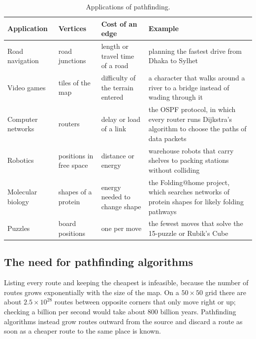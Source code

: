 \begin{table}[H]
  \centering
  \caption{Applications of pathfinding.}\label{tab:applications}
  \small
  \renewcommand{\arraystretch}{1.25}%
  \begin{tabular}{@{}P{2.5cm}P{2.6cm}P{3.1cm}P{5.6cm}@{}}
    \toprule
    Application & Vertices & Cost of an edge & Example\\
    \midrule
    Road navigation & road junctions & length or travel time of a road
      & planning the fastest drive from Dhaka to Sylhet\\
    Video games & tiles of the map & difficulty of the terrain entered
      & a character that walks around a river to a bridge instead of wading
        through it\\
    Computer networks & routers & delay or load of a link
            & the OSPF protocol, in
        which every router runs Dijkstra's algorithm to choose the paths of data
        packets\\
    Robotics & positions in free space & distance or energy
      & warehouse robots that carry shelves to packing stations without
        colliding\\
    Molecular biology & shapes of a protein & energy needed to change shape
      & the Folding@home project, which searches networks of protein shapes for
        likely folding pathways\\
    Puzzles & board positions & one per move
      & the fewest moves that solve the 15-puzzle or Rubik's
        Cube~\cite{korf1985, korf1997}\\
    \bottomrule
  \end{tabular}
\end{table}

\subsection{The need for pathfinding algorithms}\label{sec:need}

Listing every route and keeping the cheapest is infeasible, because the number
of routes grows exponentially with the size of the map. On a $50 \times 50$
grid there are about $2.5 \times 10^{28}$ routes between opposite corners that
only move right or up; checking a billion per second would take about 800
billion years. Pathfinding algorithms instead grow routes outward from the
source and discard a route as soon as a cheaper route to the same place is
known.

